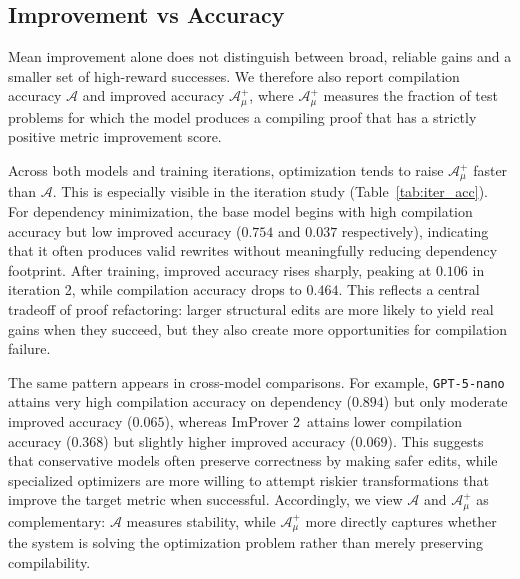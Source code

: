 \subsection{Improvement vs Accuracy}
\label{sec:acc}

Mean improvement alone does not distinguish between broad, reliable gains and a smaller set of high-reward successes.
We therefore also report compilation accuracy $\mathcal{A}$ and improved accuracy $\mathcal{A}_\mu^+$, where $\mathcal{A}_\mu^+$ measures the fraction of test problems for which the model produces a compiling proof that has a strictly positive metric improvement score.

Across both models and training iterations, optimization tends to raise $\mathcal{A}_\mu^+$ faster than $\mathcal{A}$.
This is especially visible in the iteration study (Table~\ref{tab:iter_acc}).
For dependency minimization, the base model begins with high compilation accuracy but low improved accuracy ($0.754$ and $0.037$ respectively), indicating that it often produces valid rewrites without meaningfully reducing dependency footprint.
After training, improved accuracy rises sharply, peaking at $0.106$ in iteration 2, while compilation accuracy drops to $0.464$.
This reflects a central tradeoff of proof refactoring: larger structural edits are more likely to yield real gains when they succeed, but they also create more opportunities for compilation failure.

The same pattern appears in cross-model comparisons.
For example, \texttt{GPT-5-nano} attains very high compilation accuracy on dependency ($0.894$) but only moderate improved accuracy ($0.065$), whereas ImProver 2\ attains lower compilation accuracy ($0.368$) but slightly higher improved accuracy ($0.069$).
This suggests that conservative models often preserve correctness by making safer edits, while specialized optimizers are more willing to attempt riskier transformations that improve the target metric when successful.
Accordingly, we view $\mathcal{A}$ and $\mathcal{A}_\mu^+$ as complementary: $\mathcal{A}$ measures stability, while $\mathcal{A}_\mu^+$ more directly captures whether the system is solving the optimization problem rather than merely preserving compilability.

